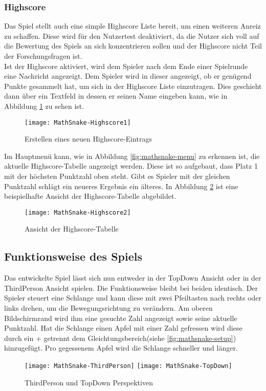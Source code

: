 \subsubsection{Highscore}
Das Spiel stellt auch eine simple Highscore Liste bereit, um einen weiteren Anreiz zu schaffen. Diese wird für den Nutzertest deaktiviert, da die Nutzer sich voll auf die Bewertung des Spiels an sich konzentrieren sollen und der Highscore nicht Teil der Forschungsfragen ist.\\
Ist der Highscore aktiviert, wird dem Spieler nach dem Ende einer Spielrunde eine Nachricht angezeigt. Dem Spieler wird in dieser angezeigt, ob er genügend Punkte gesammelt hat, um sich in der Highscore Liste einzutragen. Dies geschieht dann über ein Textfeld in dessen er seinen Name eingeben kann, wie in Abbildung \ref{fig:mathsnake-newHighscore} zu sehen ist.
\begin{figure}[htb]
	\centering
	\texttt{[image: MathSnake-Highscore1]}
	\caption{Erstellen eines neuen Highscore-Eintrags\label{fig:mathsnake-newHighscore}}
\end{figure}
Im Hauptmenü kann, wie in Abbildung \ref{fig:mathsnake-menu} zu erkennen ist, die aktuelle Highscore-Tabelle angezeigt werden. Diese ist so aufgebaut, dass Platz 1 mit der höchsten Punktzahl oben steht. Gibt es Spieler mit der gleichen Punktzahl schlägt ein neueres Ergebnis ein älteres. In Abbildung \ref{fig:mathsnake-HighscoreTable} ist eine beispielhafte Ansicht der Highscore-Tabelle abgebildet.
\begin{figure}[htb]
	\centering
	\texttt{[image: MathSnake-Highscore2]}
	\caption{Ansicht der Highscore-Tabelle\label{fig:mathsnake-HighscoreTable}}
\end{figure}
\subsection{Funktionsweise des Spiels}
Das entwickelte Spiel lässt sich nun entweder in der TopDown Ansicht oder in der ThirdPerson Ansicht spielen. Die Funktionsweise bleibt bei beiden identisch. Der Spieler steuert eine Schlange und kann diese mit zwei Pfeiltasten nach rechts oder links drehen, um die Bewegungsrichtung zu verändern. Am oberen Bildschirmrand wird ihm eine gesuchte Zahl angezeigt sowie seine aktuelle Punktzahl. Hat die Schlange einen Apfel mit einer Zahl gefressen wird diese durch ein + getrennt dem Gleichtungsbereich(siehe \ref{fig:mathsnake-setup}) hinzugefügt. Pro gegessenem Apfel wird die Schlange schneller und länger.
\begin{figure}[htb]
	\centering
	\texttt{[image: MathSnake-ThirdPerson]}
	\texttt{[image: MathSnake-TopDown]}
	\caption{ThirdPerson und TopDown Perspektiven\label{fig:mathsnake-perspektives}}
\end{figure}
